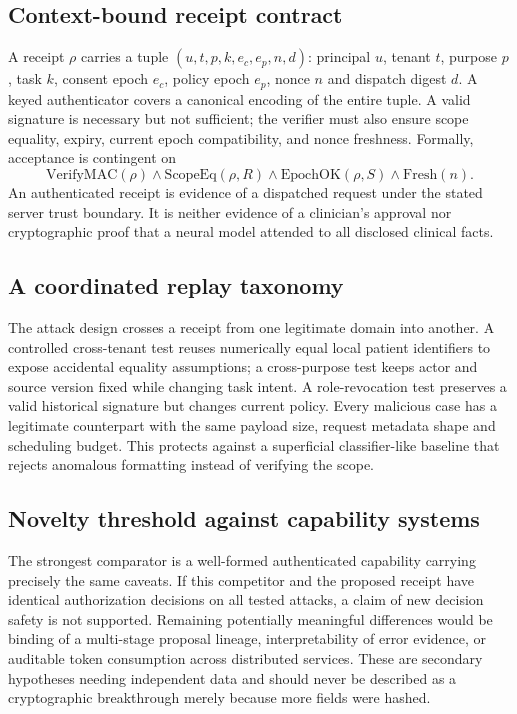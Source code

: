 \documentclass[11pt,a4paper]{article}
\begin{document}
\subsection{Context-bound receipt contract}
A receipt $\rho$ carries a tuple $(u,t,p,k,e_c,e_p,n,d)$: principal $u$, tenant $t$, purpose $p$, task $k$, consent epoch $e_c$, policy epoch $e_p$, nonce $n$ and dispatch digest $d$. A keyed authenticator covers a canonical encoding of the entire tuple. A valid signature is necessary but not sufficient; the verifier must also ensure scope equality, expiry, current epoch compatibility, and nonce freshness. Formally, acceptance is contingent on
\begin{equation}
\mathrm{VerifyMAC}(\rho)\wedge \mathrm{ScopeEq}(\rho,R)\wedge
\mathrm{EpochOK}(\rho,S)\wedge\mathrm{Fresh}(n).
\end{equation}
An authenticated receipt is evidence of a dispatched request under the stated server trust boundary. It is neither evidence of a clinician's approval nor cryptographic proof that a neural model attended to all disclosed clinical facts.

\subsection{A coordinated replay taxonomy}
The attack design crosses a receipt from one legitimate domain into another. A controlled cross-tenant test reuses numerically equal local patient identifiers to expose accidental equality assumptions; a cross-purpose test keeps actor and source version fixed while changing task intent. A role-revocation test preserves a valid historical signature but changes current policy. Every malicious case has a legitimate counterpart with the same payload size, request metadata shape and scheduling budget. This protects against a superficial classifier-like baseline that rejects anomalous formatting instead of verifying the scope.

\subsection{Novelty threshold against capability systems}
The strongest comparator is a well-formed authenticated capability carrying precisely the same caveats. If this competitor and the proposed receipt have identical authorization decisions on all tested attacks, a claim of new decision safety is not supported. Remaining potentially meaningful differences would be binding of a multi-stage proposal lineage, interpretability of error evidence, or auditable token consumption across distributed services. These are secondary hypotheses needing independent data and should never be described as a cryptographic breakthrough merely because more fields were hashed.
\end{document}
